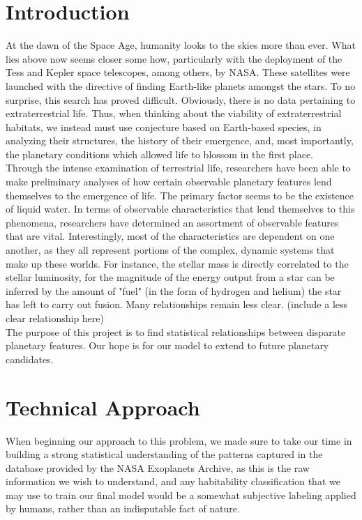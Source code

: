 \documentclass[11.5pt]{article}
\begin{document}
\section{Introduction}
At the dawn of the Space Age, humanity looks to the skies more than ever. What lies above now seems closer some how, particularly with the deployment of the Tess and Kepler space telescopes, among others, by NASA. These satellites were launched with the directive of finding Earth-like planets amongst the stars. To no surprise, this search has proved difficult. Obviously, there is no data pertaining to extraterrestrial life. Thus, when thinking about the viability of extraterrestrial habitats, we instead must use conjecture based on Earth-based species, in analyzing their structures, the history of their emergence, and, most importantly, the planetary conditions which allowed life to blossom in the first place.\\
\> Through the intense examination of terrestrial life, researchers have been able to make preliminary analyses of how certain observable planetary features lend themselves to the emergence of life. The primary factor seems to be the existence of liquid water. In terms of observable characteristics that lend themselves to this phenomena, researchers have determined an assortment of observable features that are vital. Interestingly, most of the characteristics are dependent on one another, as they all represent portions of the complex, dynamic systems that make up these worlds. For instance, the stellar mass is directly correlated to the stellar luminosity, for the magnitude of the energy output from a star can be inferred by the amount of "fuel" (in the form of hydrogen and helium) the star has left to carry out fusion. Many relationships remain less clear. (include a less clear relationship here)
\\
The purpose of this project is to find statistical relationships between disparate planetary features. Our hope is for our model to extend to future planetary candidates.


\section{Technical Approach}
\> When beginning our approach to this problem, we  made sure to take our time in building a strong statistical understanding of the patterns captured in the database provided by the NASA Exoplanets Archive, as this is the raw information we wish to understand, and any habitability classification that we may use to train our final model would be a somewhat subjective labeling applied by humans, rather than an indisputable fact of nature. 
\end{document}
